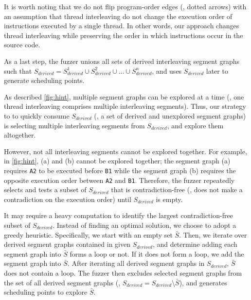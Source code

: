 It is worth noting that we do not flip program-order edges (\ie,
dotted arrows) with an assumption that thread interleaving do not
change the execution order of instructions executed by a single
thread.
%
In other words, our approach changes thread interleaving while
preserving the order in which instructions occur in the source code.






As a last step, the fuzzer unions all sets of derived interleaving
segment graphs such that
$S_{derived} = S^{1}_{derived} \cup S^{2}_{derived} \cup ... \cup
S^{n}_{derived}$, and uses $S_{derived}$ later to generate scheduling
points.




%
As described  \autoref{fig:hint}, multiple segment graphs can be
explored at a time (\ie, one thread interleaving comprises multiple
interleaving segments).
%
Thus, our strategy to to quickly consume $S_{derived}$ (\ie, a set of
derived and unexplored segment graphs) is selecting multiple
interleaving segments from $S_{derived}$, and explore them altogether.


However, not all interleaving segments cannot be explored together.
%
For example, in \autoref{fig:hint}, (a) and (b) cannot be explored
together; the segment graph (a) requires \texttt{A2} to be executed
before \texttt{B1} while the segment graph (b) requires the opposite
execution order between \texttt{A2} and \texttt{B1}.
%
Therefore, the fuzzer repeatedly selects and tests a subset of
$S_{derived}$ that is contradiction-free (\ie, does not make a
contradiction on the execution order) until $S_{derived}$ is empty.


It may require a heavy computation to identify the largest
contradiction-free subset of $S_{derived}$.
%
Instead of finding an optimal solution, we choose to adopt a greedy
heuristic.
%
Specifically, we start with an empty set $\bar{S}$. Then, we iterate
over derived segment graphs contained in given $S_{derived}$, and
determine adding each segment graph into $\bar{S}$ forms a loop or
not. If it does not form a loop, we add the segment graph into
$\bar{S}$.
%
After iterating all derived segment graphs in $S_{derived}$, $\bar{S}$
does not contain a loop. The fuzzer then excludes selected segment
graphs from the set of all derived segment graphs (\ie,
$S_{derived} = S_{derived} \setminus \bar{S}$), and generates
scheduling points to explore $\bar{S}$.









